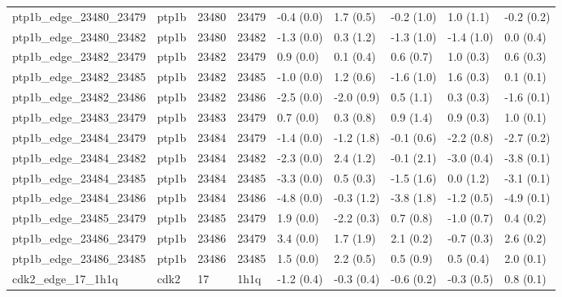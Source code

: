 \begin{tabular}{lllllllll}
ptp1b\_edge\_23480\_23479           &     ptp1b &       23480 &       23479 &  -0.4 (0.0) &         1.7 (0.5) &  -0.2 (1.0) &   1.0 (1.1) &  -0.2 (0.2) \\
ptp1b\_edge\_23480\_23482           &     ptp1b &       23480 &       23482 &  -1.3 (0.0) &         0.3 (1.2) &  -1.3 (1.0) &  -1.4 (1.0) &   0.0 (0.4) \\
ptp1b\_edge\_23482\_23479           &     ptp1b &       23482 &       23479 &   0.9 (0.0) &         0.1 (0.4) &   0.6 (0.7) &   1.0 (0.3) &   0.6 (0.3) \\
ptp1b\_edge\_23482\_23485           &     ptp1b &       23482 &       23485 &  -1.0 (0.0) &         1.2 (0.6) &  -1.6 (1.0) &   1.6 (0.3) &   0.1 (0.1) \\
ptp1b\_edge\_23482\_23486           &     ptp1b &       23482 &       23486 &  -2.5 (0.0) &        -2.0 (0.9) &   0.5 (1.1) &   0.3 (0.3) &  -1.6 (0.1) \\
ptp1b\_edge\_23483\_23479           &     ptp1b &       23483 &       23479 &   0.7 (0.0) &         0.3 (0.8) &   0.9 (1.4) &   0.9 (0.3) &   1.0 (0.1) \\
ptp1b\_edge\_23484\_23479           &     ptp1b &       23484 &       23479 &  -1.4 (0.0) &        -1.2 (1.8) &  -0.1 (0.6) &  -2.2 (0.8) &  -2.7 (0.2) \\
ptp1b\_edge\_23484\_23482           &     ptp1b &       23484 &       23482 &  -2.3 (0.0) &         2.4 (1.2) &  -0.1 (2.1) &  -3.0 (0.4) &  -3.8 (0.1) \\
ptp1b\_edge\_23484\_23485           &     ptp1b &       23484 &       23485 &  -3.3 (0.0) &         0.5 (0.3) &  -1.5 (1.6) &   0.0 (1.2) &  -3.1 (0.1) \\
ptp1b\_edge\_23484\_23486           &     ptp1b &       23484 &       23486 &  -4.8 (0.0) &        -0.3 (1.2) &  -3.8 (1.8) &  -1.2 (0.5) &  -4.9 (0.1) \\
ptp1b\_edge\_23485\_23479           &     ptp1b &       23485 &       23479 &   1.9 (0.0) &        -2.2 (0.3) &   0.7 (0.8) &  -1.0 (0.7) &   0.4 (0.2) \\
ptp1b\_edge\_23486\_23479           &     ptp1b &       23486 &       23479 &   3.4 (0.0) &         1.7 (1.9) &   2.1 (0.2) &  -0.7 (0.3) &   2.6 (0.2) \\
ptp1b\_edge\_23486\_23485           &     ptp1b &       23486 &       23485 &   1.5 (0.0) &         2.2 (0.5) &   0.5 (0.9) &   0.5 (0.4) &   2.0 (0.1) \\
cdk2\_edge\_17\_1h1q                &      cdk2 &          17 &        1h1q &  -1.2 (0.4) &        -0.3 (0.4) &  -0.6 (0.2) &  -0.3 (0.5) &   0.8 (0.1) \\

\end{tabular}
